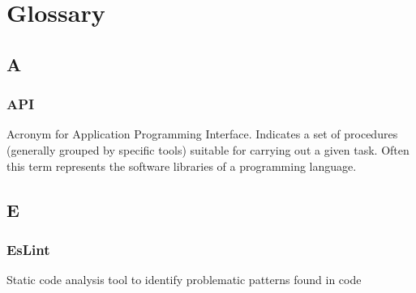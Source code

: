\appendix
\section{Glossary}\label{_glossary}

\subsection*{A}
\subsubsection*{API}
Acronym for Application Programming Interface. Indicates a set of procedures
(generally grouped by specific tools) suitable for carrying out a given task. Often this term
represents the software libraries of a programming language.


\subsection*{E}
\subsubsection*{EsLint}
Static code analysis tool to identify problematic patterns found in 
code
